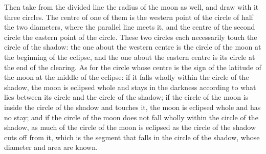 \documentclass[11pt]{article}
\begin{document}
\par Then take from the divided line the radius of the moon as well, and draw with it three circles. The centre of one of them is the western point of the circle of half the two diameters, where the parallel line meets it, and the centre of the second circle the eastern point of the circle. These two circles each necessarily touch the circle of the shadow: the one about the western centre is the circle of the moon at the beginning of the eclipse, and the one about the eastern centre is its circle at the end of the clearing. As for the circle whose centre is the sign of the latitude of the moon at the middle of the eclipse: if it falls wholly within the circle of the shadow, the moon is eclipsed whole and stays in the darkness according to what lies between its circle and the circle of the shadow; if the circle of the moon is inside the circle of the shadow and touches it, the moon is eclipsed whole and has no stay; and if the circle of the moon does not fall wholly within the circle of the shadow, as much of the circle of the moon is eclipsed as the circle of the shadow cuts off from it, which is the segment that falls in the circle of the shadow, whose diameter and area are known.\par
\end{document}
